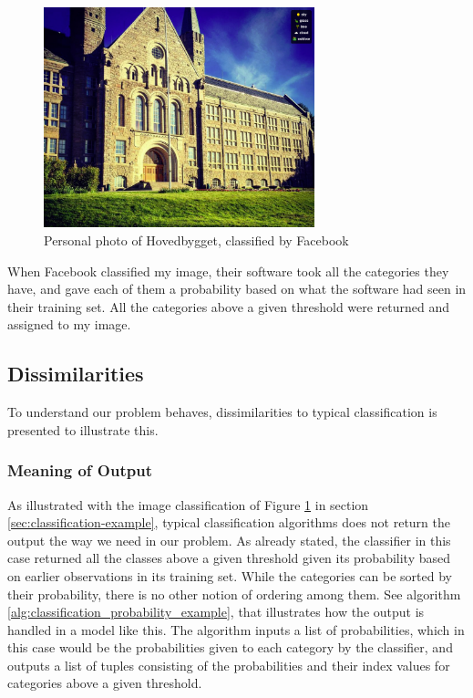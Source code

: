 \begin{figure}[H]
    \label{fig:facebook-classification-example}
    \centering
    \includegraphics[width=0.7\textwidth]{fig/chapter4/facebook_classification_example.jpg}
    \caption{Personal photo of Hovedbygget, classified by Facebook}
\end{figure}

When Facebook classified my image, their software took all the categories they have, and gave each of them a probability based on what the software had seen in their training set. All the categories above a given threshold were returned and assigned to my image. 

\subsection{Dissimilarities}
To understand our problem behaves, dissimilarities to typical classification is presented to illustrate this.

\subsubsection{Meaning of Output}
As illustrated with the image classification of Figure \ref{fig:facebook-classification-example} in section \ref{sec:classification-example}, typical classification algorithms does not return the output the way we need in our problem. As already stated, the classifier in this case returned all the classes above a given threshold given its probability based on earlier observations in its training set. While the categories can be sorted by their probability, there is no other notion of ordering among them. See algorithm \ref{alg:classification_probability_example}, that illustrates how the output is handled in a model like this. The algorithm inputs a list of probabilities, which in this case would be the probabilities given to each category by the classifier, and outputs a list of tuples consisting of the probabilities and their index values for categories above a given threshold.

